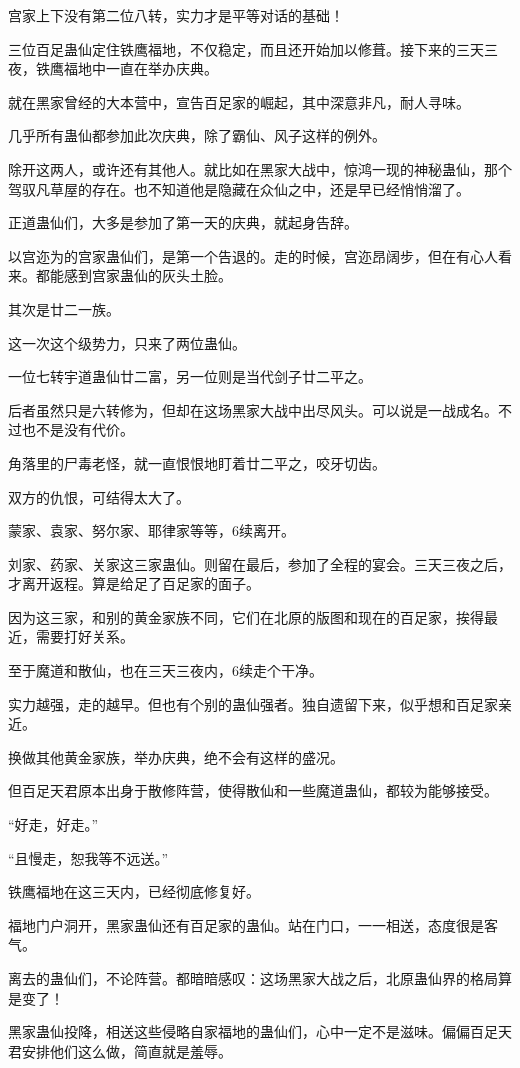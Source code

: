\begin{this_body}
宫家上下没有第二位八转，实力才是平等对话的基础！

三位百足蛊仙定住铁鹰福地，不仅稳定，而且还开始加以修葺。接下来的三天三夜，铁鹰福地中一直在举办庆典。

就在黑家曾经的大本营中，宣告百足家的崛起，其中深意非凡，耐人寻味。

几乎所有蛊仙都参加此次庆典，除了霸仙、风子这样的例外。

除开这两人，或许还有其他人。就比如在黑家大战中，惊鸿一现的神秘蛊仙，那个驾驭凡草屋的存在。也不知道他是隐藏在众仙之中，还是早已经悄悄溜了。

正道蛊仙们，大多是参加了第一天的庆典，就起身告辞。

以宫迩为的宫家蛊仙们，是第一个告退的。走的时候，宫迩昂阔步，但在有心人看来。都能感到宫家蛊仙的灰头土脸。

其次是廿二一族。

这一次这个级势力，只来了两位蛊仙。

一位七转宇道蛊仙廿二富，另一位则是当代剑子廿二平之。

后者虽然只是六转修为，但却在这场黑家大战中出尽风头。可以说是一战成名。不过也不是没有代价。

角落里的尸毒老怪，就一直恨恨地盯着廿二平之，咬牙切齿。

双方的仇恨，可结得太大了。

蒙家、袁家、努尔家、耶律家等等，6续离开。

刘家、药家、关家这三家蛊仙。则留在最后，参加了全程的宴会。三天三夜之后，才离开返程。算是给足了百足家的面子。

因为这三家，和别的黄金家族不同，它们在北原的版图和现在的百足家，挨得最近，需要打好关系。

至于魔道和散仙，也在三天三夜内，6续走个干净。

实力越强，走的越早。但也有个别的蛊仙强者。独自遗留下来，似乎想和百足家亲近。

换做其他黄金家族，举办庆典，绝不会有这样的盛况。

但百足天君原本出身于散修阵营，使得散仙和一些魔道蛊仙，都较为能够接受。

“好走，好走。”

“且慢走，恕我等不远送。”

铁鹰福地在这三天内，已经彻底修复好。

福地门户洞开，黑家蛊仙还有百足家的蛊仙。站在门口，一一相送，态度很是客气。

离去的蛊仙们，不论阵营。都暗暗感叹：这场黑家大战之后，北原蛊仙界的格局算是变了！

黑家蛊仙投降，相送这些侵略自家福地的蛊仙们，心中一定不是滋味。偏偏百足天君安排他们这么做，简直就是羞辱。


\end{this_body}
